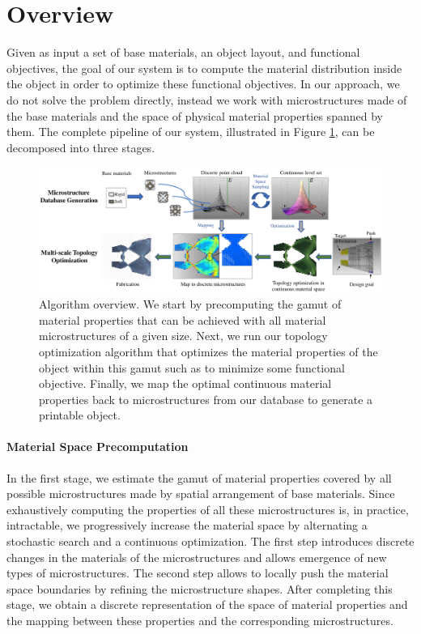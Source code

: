 \section{Overview}
Given as input a set of base materials, an object layout, and functional objectives, the goal of our system is to compute the material distribution inside the object in order to optimize these functional objectives. In our approach, we do not solve the problem directly, instead we work with microstructures made of the base materials and the space of physical material properties spanned by them. The complete pipeline of our system, illustrated in Figure \ref{fig:overview}, can be decomposed into three stages.
\begin{figure}
	\centering
	\includegraphics[width=.95\linewidth]{figs/Overview.pdf}
	\caption{
		Algorithm overview. We start by precomputing the gamut of material properties that can be achieved with all material microstructures of a given size. Next, we run our topology optimization algorithm that optimizes the material properties of the object within this gamut such as to minimize some functional objective. Finally, we map the optimal continuous material properties back to microstructures from our database to generate a printable object.
	}
	\label{fig:overview}
\end{figure}
\paragraph{Material Space Precomputation}
In the first stage, we estimate the gamut of material properties covered by all possible microstructures made by spatial arrangement of base materials. 
Since exhaustively computing the properties of all these microstructures is, in practice, intractable, we progressively increase the material space by alternating a stochastic search and a continuous optimization. The first step introduces discrete changes in the materials of the microstructures and allows emergence of new types of microstructures. The second step allows to locally push the material space boundaries by refining the microstructure shapes. After completing this stage, we obtain a discrete representation of the space of material properties and the mapping between these properties and the corresponding microstructures.

